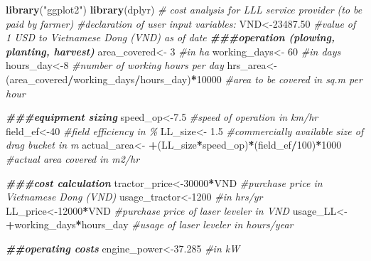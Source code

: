 \documentclass[
]{article}
\newenvironment{Shaded}{\begin{snugshade}}{\end{snugshade}}
\newcommand{\CommentTok}[1]{\textcolor[rgb]{0.56,0.35,0.01}{\textit{#1}}}
\newcommand{\DecValTok}[1]{\textcolor[rgb]{0.00,0.00,0.81}{#1}}
\newcommand{\DocumentationTok}[1]{\textcolor[rgb]{0.56,0.35,0.01}{\textbf{\textit{#1}}}}
\newcommand{\FloatTok}[1]{\textcolor[rgb]{0.00,0.00,0.81}{#1}}
\newcommand{\FunctionTok}[1]{\textcolor[rgb]{0.13,0.29,0.53}{\textbf{#1}}}
\newcommand{\NormalTok}[1]{#1}
\newcommand{\OtherTok}[1]{\textcolor[rgb]{0.56,0.35,0.01}{#1}}
\newcommand{\SpecialCharTok}[1]{\textcolor[rgb]{0.81,0.36,0.00}{\textbf{#1}}}
\newcommand{\StringTok}[1]{\textcolor[rgb]{0.31,0.60,0.02}{#1}}
\begin{document}
\begin{Shaded}
\begin{Highlighting}[]
\FunctionTok{library}\NormalTok{(}\StringTok{"ggplot2"}\NormalTok{)}
\FunctionTok{library}\NormalTok{(dplyr)}
\CommentTok{\# cost analysis for LLL service provider (to be paid by farmer)}
\CommentTok{\#declaration of user input variables:}
\NormalTok{VND}\OtherTok{\textless{}{-}}\FloatTok{23487.50} \CommentTok{\#value of 1 USD to Vietnamese Dong (VND) as of date}
\DocumentationTok{\#\#\#operation (plowing, planting, harvest)}
\NormalTok{area\_covered}\OtherTok{\textless{}{-}} \DecValTok{3} \CommentTok{\#in ha}
\NormalTok{working\_days}\OtherTok{\textless{}{-}} \DecValTok{60} \CommentTok{\#in days}
\NormalTok{hours\_day}\OtherTok{\textless{}{-}}\DecValTok{8} \CommentTok{\#number of working hours per day}
\NormalTok{hrs\_area}\OtherTok{\textless{}{-}}\NormalTok{(area\_covered}\SpecialCharTok{/}\NormalTok{working\_days}\SpecialCharTok{/}\NormalTok{hours\_day)}\SpecialCharTok{*}\DecValTok{10000} \CommentTok{\#area to be covered in sq.m per hour}

\DocumentationTok{\#\#\#equipment sizing}
\NormalTok{speed\_op}\OtherTok{\textless{}{-}}\FloatTok{7.5} \CommentTok{\#speed of operation in km/hr}
\NormalTok{field\_ef}\OtherTok{\textless{}{-}}\DecValTok{40} \CommentTok{\#field efficiency in \%}
\NormalTok{LL\_size}\OtherTok{\textless{}{-}} \FloatTok{1.5} \CommentTok{\#commercially available size of drag bucket in m}
\NormalTok{actual\_area}\OtherTok{\textless{}{-}} \SpecialCharTok{+}\NormalTok{(LL\_size}\SpecialCharTok{*}\NormalTok{speed\_op)}\SpecialCharTok{*}\NormalTok{(field\_ef}\SpecialCharTok{/}\DecValTok{100}\NormalTok{)}\SpecialCharTok{*}\DecValTok{1000} \CommentTok{\#actual area covered in m2/hr}

\DocumentationTok{\#\#\#cost calculation}
\NormalTok{tractor\_price}\OtherTok{\textless{}{-}}\DecValTok{30000}\SpecialCharTok{*}\NormalTok{VND }\CommentTok{\#purchase price in Vietnamese Dong (VND)}
\NormalTok{usage\_tractor}\OtherTok{\textless{}{-}}\DecValTok{1200} \CommentTok{\#in hrs/yr}
\NormalTok{LL\_price}\OtherTok{\textless{}{-}}\DecValTok{12000}\SpecialCharTok{*}\NormalTok{VND }\CommentTok{\#purchase price of laser leveler in VND}
\NormalTok{usage\_LL}\OtherTok{\textless{}{-}} \SpecialCharTok{+}\NormalTok{working\_days}\SpecialCharTok{*}\NormalTok{hours\_day }\CommentTok{\#usage of laser leveler in hours/year}

\DocumentationTok{\#\#operating costs}
\NormalTok{engine\_power}\OtherTok{\textless{}{-}}\FloatTok{37.285} \CommentTok{\#in kW}


\end{Highlighting}
\end{Shaded}
\end{document}
